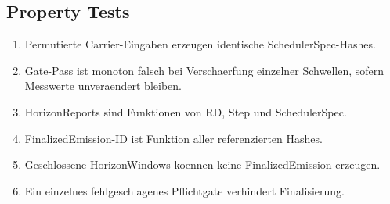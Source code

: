 \documentclass[11pt,a4paper]{article}
\begin{document}
\subsection{Property Tests}
\begin{enumerate}
  \item Permutierte Carrier-Eingaben erzeugen identische SchedulerSpec-Hashes.
  \item Gate-Pass ist monoton falsch bei Verschaerfung einzelner Schwellen, sofern Messwerte unveraendert bleiben.
  \item HorizonReports sind Funktionen von RD, Step und SchedulerSpec.
  \item FinalizedEmission-ID ist Funktion aller referenzierten Hashes.
  \item Geschlossene HorizonWindows koennen keine FinalizedEmission erzeugen.
  \item Ein einzelnes fehlgeschlagenes Pflichtgate verhindert Finalisierung.
\end{enumerate}
\end{document}
